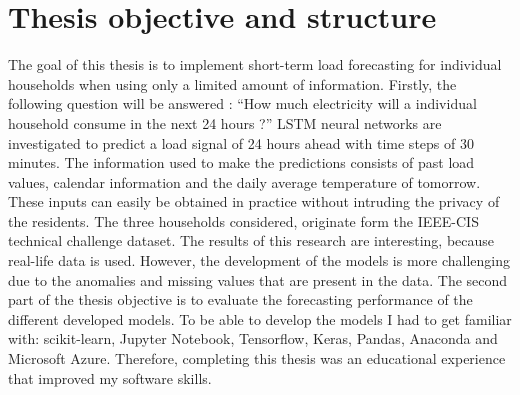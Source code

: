 \section{Thesis objective and structure}
The goal of this thesis is to implement short-term load forecasting for individual households when using only a limited amount of information. Firstly, the following question will be answered : ``How much electricity will a individual household consume in the next 24 hours ?'' LSTM neural networks are investigated to predict a load signal of 24 hours ahead with time steps of 30 minutes. The information used to make the predictions consists of past load values, calendar information and the daily average temperature of tomorrow. These inputs can easily be obtained in practice without intruding the privacy of the residents. The three households considered, originate form the IEEE-CIS technical challenge dataset. The results of this research are interesting, because real-life data is used. However, the development of the models is more challenging due to the anomalies and missing values that are present in the data. The second part of the thesis objective is to evaluate the forecasting performance of the different developed models. To be able to develop the models I had to get familiar with: scikit-learn, Jupyter Notebook, Tensorflow, Keras, Pandas, Anaconda and Microsoft Azure. Therefore, completing this thesis was an educational experience that improved my software skills.\\ 

